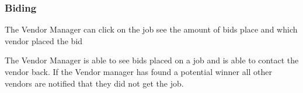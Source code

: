 \documentclass[10pt]{article}
\newcounter{subsubsubsection}[subsubsection]
\begin{document}
\subsubsection{Biding}


The Vendor Manager can click on the job see the amount of bids place and which vendor placed the bid


The Vendor Manager is able to see bids placed on a job and is able to contact the vendor back. If the Vendor manager has found a potential winner all other vendors are notified that they did not get the job.
\end{document}
